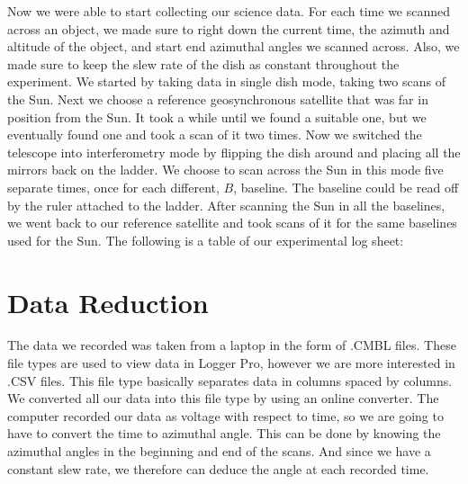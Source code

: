 \documentclass{aastex61}
\begin{document}
Now we were able to start collecting our science data. For each time we scanned across an object, we made sure to right down the current time, the azimuth and altitude of the object, and start end azimuthal angles we scanned across. Also, we made sure to keep the slew rate of the dish as constant throughout the experiment. We started by taking data in single dish mode, taking two scans of the Sun. Next we choose a reference geosynchronous satellite that was far in position from the Sun. It took a while until we found a suitable one, but we eventually found one and took a scan of it two times. Now we switched the telescope into interferometry mode by flipping the dish around and placing all the mirrors back on the ladder. We choose to scan across the Sun in this mode five separate times, once for each different, $B$, baseline. The baseline could be read off by the ruler attached to the ladder. After scanning the Sun in all the baselines, we went back to our reference satellite and took scans of it for the same baselines used for the Sun. The following is a table of our experimental log sheet: 

\section{Data Reduction}
The data we recorded was taken from a laptop in the form of .CMBL files. These file types are used to view data in Logger Pro, however we are more interested in .CSV files. This file type basically separates data in columns spaced by columns. We converted all our data into this file type by using an online converter. The computer recorded our data as voltage with respect to time, so we are going to have to convert the time to azimuthal angle. This can be done by knowing the azimuthal angles in the beginning and end of the scans. And since we have a constant slew rate, we therefore can deduce the angle at each recorded time.
\end{document}
